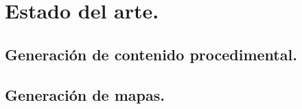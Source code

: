 \chapter{Estado del arte.}\label{cap:capitulo1}

\section{Generación de contenido procedimental.}



\section{Generación de mapas.}



